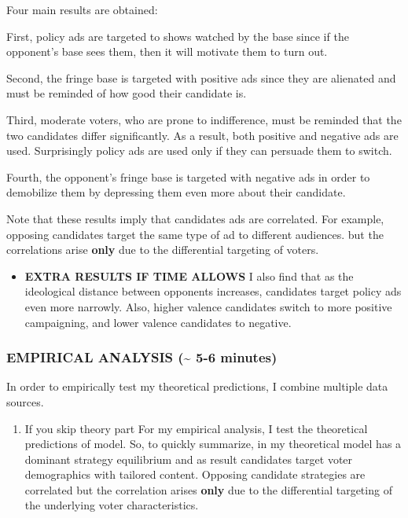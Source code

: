 \documentclass[12pt]{article}
\theoremstyle{plain}
\theoremstyle{plain}
\theoremstyle{plain}
\theoremstyle{plain}
\theoremstyle{plain}
\theoremstyle{plain}
\begin{document}
\begin{itemize}
Four main results are obtained:

First, policy ads are targeted to shows watched by the base since if the opponent's base sees them, then it will motivate them to turn out.

Second, the fringe base is targeted with positive ads since they are alienated and must be reminded of how good their candidate is.

Third, moderate voters, who are prone to indifference, must be reminded that the two candidates differ significantly.
As a result, both positive and negative ads are used.
Surprisingly policy ads are used only if they can persuade them to switch.

Fourth, the opponent's fringe base is targeted with negative ads in order to demobilize them by depressing them even more about their candidate.

Note that these results imply that candidates ads are correlated.
For example, opposing candidates target the same type of ad to different audiences.
but the correlations arise \textbf{only} due to the differential targeting of voters.
\end{itemize}


\begin{itemize}
\item \textbf{EXTRA RESULTS IF TIME ALLOWS}
I also find that as the ideological distance between opponents increases, candidates target policy ads even more narrowly.
Also, higher valence candidates switch to more positive campaigning, and lower valence candidates to negative.
\end{itemize}

\subsubsection{EMPIRICAL ANALYSIS (\textasciitilde{} 5-6 minutes)}
\label{sec:org29f935b}

In order to empirically test my theoretical predictions, I combine multiple data sources.

\begin{enumerate}
\item If you skip theory part
\label{sec:org8a220de}
For my empirical analysis, I test the theoretical predictions of model.
So, to quickly summarize, in my theoretical model has a dominant strategy equilibrium
and as result candidates target voter demographics with tailored content.
Opposing candidate strategies are correlated but the correlation arises \textbf{only}
due to the differential targeting of the underlying voter characteristics.
\end{enumerate}
\end{document}
